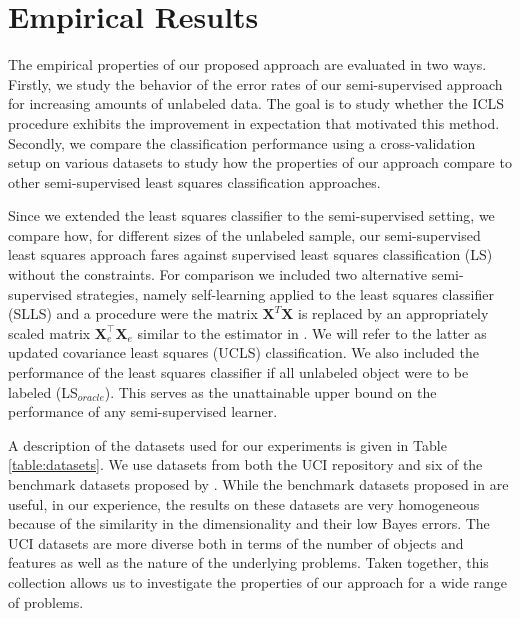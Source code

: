 \documentclass{elsarticle}
\newcommand{\Xe}{\mathbf{X}_e  }
\newcommand{\XeT}{\mathbf{X}_e^{\top}}
\begin{document}
\section{Empirical Results} 
\label{section:empiricalresults}

The empirical properties of our proposed approach are evaluated in two ways. Firstly, we study the behavior of the error rates of our semi-supervised approach for increasing amounts of unlabeled data. The goal is to study whether the ICLS procedure exhibits the improvement in expectation that motivated this method. Secondly, we compare the classification performance using a cross-validation setup on various datasets to study how the properties of our approach compare to other semi-supervised least squares classification approaches.

Since we extended the least squares classifier to the semi-supervised setting, we compare how, for different sizes of the unlabeled sample,  our semi-supervised least squares approach fares against supervised least squares classification (LS) without the constraints. For comparison we included two alternative semi-supervised strategies, namely self-learning applied to the least squares classifier (SLLS) and a procedure were the matrix $\mathbf{X}^T \mathbf{X}$ is replaced by an appropriately scaled matrix $\XeT \Xe$ similar to the estimator in \cite{Shaffer1991}. We will refer to the latter as updated covariance least squares (UCLS) classification. We also included the performance of the least squares classifier if all unlabeled object were to be labeled (LS$_{oracle}$). This serves as the unattainable upper bound on the performance of any semi-supervised learner. 

A description of the datasets used for our experiments is given in Table \ref{table:datasets}. We use datasets from both the UCI repository \cite{Bache2013} and six of the benchmark datasets proposed by \cite{Chapelle2006}. While the benchmark datasets proposed in \cite{Chapelle2006} are useful, in our experience, the results on these datasets are very homogeneous because of the similarity in the dimensionality and their low Bayes errors. The UCI datasets are more diverse both in terms of the number of objects and features as well as the nature of the underlying problems. Taken together, this collection allows us to investigate the properties of our approach for a wide range of problems.
\end{document}
